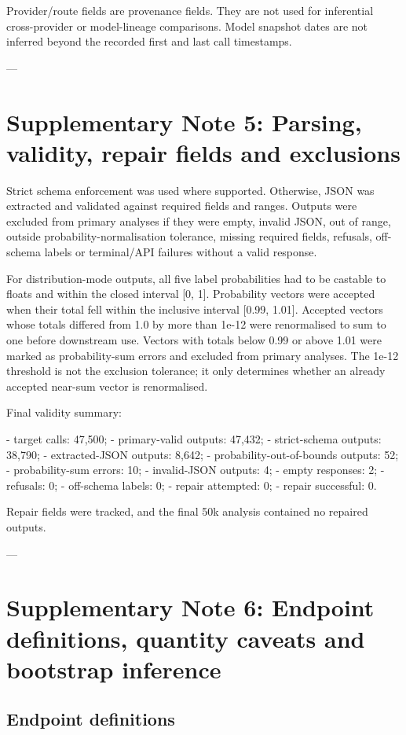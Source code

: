 \documentclass[11pt]{article}
\begin{document}
Provider/route fields are provenance fields. They are not used for inferential cross-provider or model-lineage comparisons. Model snapshot dates are not inferred beyond the recorded first and last call timestamps.

---

\section{Supplementary Note 5: Parsing, validity, repair fields and exclusions}

Strict schema enforcement was used where supported. Otherwise, JSON was extracted and validated against required fields and ranges. Outputs were excluded from primary analyses if they were empty, invalid JSON, out of range, outside probability-normalisation tolerance, missing required fields, refusals, off-schema labels or terminal/API failures without a valid response.

For distribution-mode outputs, all five label probabilities had to be castable to floats and within the closed interval [0, 1]. Probability vectors were accepted when their total fell within the inclusive interval [0.99, 1.01]. Accepted vectors whose totals differed from 1.0 by more than 1e-12 were renormalised to sum to one before downstream use. Vectors with totals below 0.99 or above 1.01 were marked as probability-sum errors and excluded from primary analyses. The 1e-12 threshold is not the exclusion tolerance; it only determines whether an already accepted near-sum vector is renormalised.

Final validity summary:

- target calls: 47,500;
- primary-valid outputs: 47,432;
- strict-schema outputs: 38,790;
- extracted-JSON outputs: 8,642;
- probability-out-of-bounds outputs: 52;
- probability-sum errors: 10;
- invalid-JSON outputs: 4;
- empty responses: 2;
- refusals: 0;
- off-schema labels: 0;
- repair attempted: 0;
- repair successful: 0.

Repair fields were tracked, and the final 50k analysis contained no repaired outputs.

---

\section{Supplementary Note 6: Endpoint definitions, quantity caveats and bootstrap inference}

\subsection{Endpoint definitions}
\end{document}
